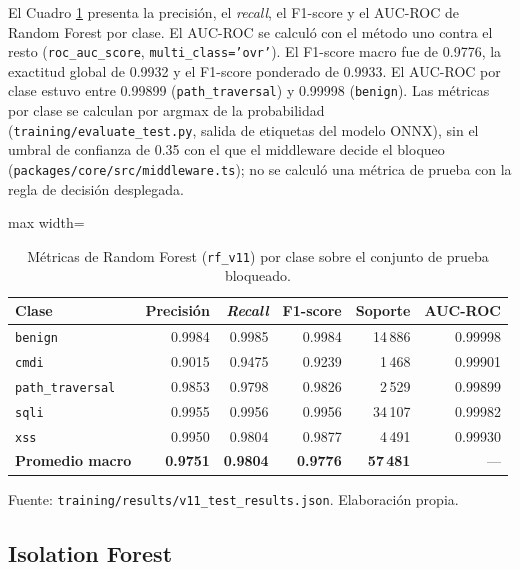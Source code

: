 El Cuadro \ref{tabla:res-rf} presenta la precisión, el \textit{recall}, el F1-score y el AUC-ROC de Random Forest por clase. El AUC-ROC se calculó con el método uno contra el resto (\texttt{roc\_auc\_score}, \texttt{multi\_class='ovr'}). El F1-score macro fue de 0.9776, la exactitud global de 0.9932 y el F1-score ponderado de 0.9933. El AUC-ROC por clase estuvo entre 0.99899 (\texttt{path\_traversal}) y 0.99998 (\texttt{benign}). Las métricas por clase se calculan por argmax de la probabilidad (\texttt{training/evaluate\_test.py}, salida de etiquetas del modelo ONNX), sin el umbral de confianza de 0.35 con el que el middleware decide el bloqueo (\texttt{packages/core/src/middleware.ts}); no se calculó una métrica de prueba con la regla de decisión desplegada.

\begin{table}[htbp]
\centering
\footnotesize
\setlength{\tabcolsep}{3pt}
\begin{adjustbox}{max width=\linewidth}
\begin{tabular}{|l|r|r|r|r|r|}
\hline
\textbf{Clase} & \textbf{Precisión} & \textbf{\textit{Recall}} & \textbf{F1-score} & \textbf{Soporte} & \textbf{AUC-ROC} \\ \hline
\texttt{benign} & 0.9984 & 0.9985 & 0.9984 & 14\,886 & 0.99998 \\ \hline
\texttt{cmdi} & 0.9015 & 0.9475 & 0.9239 & 1\,468 & 0.99901 \\ \hline
\texttt{path\_traversal} & 0.9853 & 0.9798 & 0.9826 & 2\,529 & 0.99899 \\ \hline
\texttt{sqli} & 0.9955 & 0.9956 & 0.9956 & 34\,107 & 0.99982 \\ \hline
\texttt{xss} & 0.9950 & 0.9804 & 0.9877 & 4\,491 & 0.99930 \\ \hline
\textbf{Promedio macro} & \textbf{0.9751} & \textbf{0.9804} & \textbf{0.9776} & \textbf{57\,481} & --- \\ \hline
\end{tabular}
\end{adjustbox}
\caption{Métricas de Random Forest (\texttt{rf\_v11}) por clase sobre el conjunto de prueba bloqueado.}
\label{tabla:res-rf}
\par\smallskip\footnotesize Fuente: \texttt{training/results/v11\_test\_results.json}. Elaboración propia.
\end{table}

\subsection{Isolation Forest}


